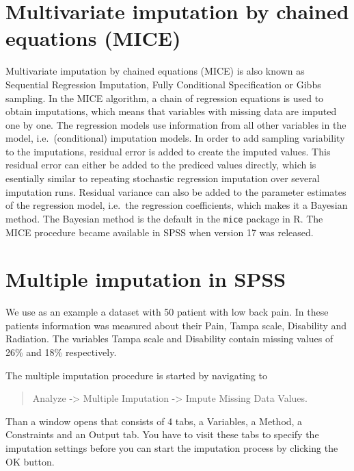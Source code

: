 \documentclass[
]{book}
\begin{document}
\hypertarget{multivariate-imputation-by-chained-equations-mice}{%
\section{Multivariate imputation by chained equations (MICE)}\label{multivariate-imputation-by-chained-equations-mice}}

Multivariate imputation by chained equations (MICE) \citep{VanBuuren2018} is also known as Sequential Regression Imputation, Fully Conditional Specification or Gibbs sampling. In the MICE algorithm, a chain of regression equations is used to obtain imputations, which means that variables with missing data are imputed one by one. The regression models use information from all other variables in the model, i.e.~(conditional) imputation models. In order to add sampling variability to the imputations, residual error is added to create the imputed values. This residual error can either be added to the prediced values directly, which is esentially similar to repeating stochastic regression imputation over several imputation runs. Residual variance can also be added to the parameter estimates of the regression model, i.e.~the regression coefficients, which makes it a Bayesian method. The Bayesian method is the default in the \texttt{mice} package in R. The MICE procedure became available in SPSS when version 17 was released.

\hypertarget{multiple-imputation-in-spss}{%
\section{Multiple imputation in SPSS}\label{multiple-imputation-in-spss}}

We use as an example a dataset with 50 patient with low back pain. In these patients information was measured about their Pain, Tampa scale, Disability and Radiation. The variables Tampa scale and Disability contain missing values of 26\% and 18\% respectively.

The multiple imputation procedure is started by navigating to

\begin{quote}
Analyze -\textgreater{} Multiple Imputation -\textgreater{} Impute Missing Data Values.
\end{quote}

Than a window opens that consists of 4 tabs, a Variables, a Method, a Constraints and an Output tab. You have to visit these tabs to specify the imputation settings before you can start the imputation process by clicking the OK button.
\end{document}
